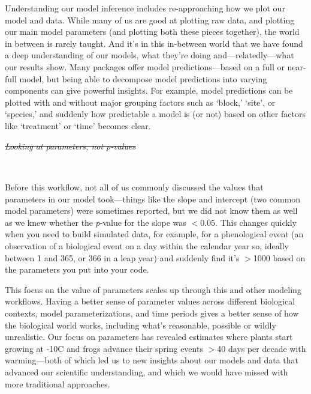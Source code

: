 \documentclass[11pt]{article}
\providecommand{\DIFaddtex}[1]{{\protect\color{blue}\uwave{#1}}} %
\providecommand{\DIFdeltex}[1]{{\protect\color{red}\sout{#1}}}                      %
\providecommand{\DIFaddbegin}{} %
\providecommand{\DIFaddend}{} %
\providecommand{\DIFdelbegin}{} %
\providecommand{\DIFdelend}{} %
\providecommand{\DIFadd}[1]{\texorpdfstring{\DIFaddtex{#1}}{#1}} %
\providecommand{\DIFdel}[1]{\texorpdfstring{\DIFdeltex{#1}}{}} %
\newcommand{\DIFscaledelfig}{0.5}
\newlength{\DIFdelgraphicswidth} %
\newlength{\DIFdelgraphicsheight} %
\newcommand{\DIFaddincludegraphics}[2][]{{\color{blue}\fbox{\DIFOincludegraphics[#1]{#2}}}} %
\newcommand{\DIFdelincludegraphics}[2][]{%
\sbox{\DIFdelgraphicsbox}{\DIFOincludegraphics[#1]{#2}}%
\settoboxwidth{\DIFdelgraphicswidth}{\DIFdelgraphicsbox} %
\settoboxtotalheight{\DIFdelgraphicsheight}{\DIFdelgraphicsbox} %
\scalebox{\DIFscaledelfig}{%
\parbox[b]{\DIFdelgraphicswidth}{\usebox{\DIFdelgraphicsbox}\\[-\baselineskip] \rule{\DIFdelgraphicswidth}{0em}}\llap{\resizebox{\DIFdelgraphicswidth}{\DIFdelgraphicsheight}{%
\setlength{\unitlength}{\DIFdelgraphicswidth}%
\begin{picture}(1,1)%
\thicklines\linethickness{2pt} %
{\color[rgb]{1,0,0}\put(0,0){\framebox(1,1){}}}%
{\color[rgb]{1,0,0}\put(0,0){\line( 1,1){1}}}%
{\color[rgb]{1,0,0}\put(0,1){\line(1,-1){1}}}%
\end{picture}%
}\hspace*{3pt}}} %
} %
\DeclareRobustCommand{\DIFaddbegin}{\DIFOaddbegin \let\includegraphics\DIFaddincludegraphics} %
\DeclareRobustCommand{\DIFaddend}{\DIFOaddend \let\includegraphics\DIFOincludegraphics} %
\DeclareRobustCommand{\DIFdelbegin}{\DIFOdelbegin \let\includegraphics\DIFdelincludegraphics} %
\DeclareRobustCommand{\DIFdelend}{\DIFOaddend \let\includegraphics\DIFOincludegraphics} %
\begin{document}
Understanding our model inference includes re-approaching how we plot our model and data. While many of us are good at plotting raw data, and plotting our main model parameters (and plotting both these pieces together), the world in between is rarely taught. And it's in this in-between world that we have found a deep understanding of our models, what they're doing and---relatedly---what our results show. Many packages offer model predictions---based on a full or near-full model, but being able to decompose model predictions into varying components can give powerful insights. For example, model predictions can be plotted with and without major grouping factors such as `block,' `site', or `species,' and suddenly how predictable a model is (or not) based on other factors like `treatment' or `time' becomes clear. 

\DIFdelbegin \emph{\DIFdel{Looking at parameters, not p-values}} %
\DIFdelend \DIFaddbegin \subsection{\DIFadd{Looking at parameters, not p-values}} \DIFaddend \\
Before this workflow, not all of us commonly discussed the values that parameters in our model took---things like the slope and intercept (two common model parameters) were sometimes reported, but we did not know them as well as we knew whether the $p$-value for the slope was $<0.05$. This changes quickly when you need to build simulated data, for example, for a phenological event (an observation of a biological event on a day within the calendar year so, ideally between 1 and 365, or 366 in a leap year) and suddenly find it's $>$1000 based on the parameters you put into your code. 

This focus on the value of parameters scales up through this and other modeling workflows. Having a better sense of parameter values across different biological contexts, model parameterizations, and time periods gives a better sense of how the biological world works, including what's reasonable, possible or wildly unrealistic. Our focus on parameters has revealed estimates where plants start growing at -10\degree C and frogs advance their spring events $>$40 days per decade with warming---both of which led us to new insights about our models and data that advanced our scientific understanding, and which we would have missed with more traditional approaches.  %
\end{document}
